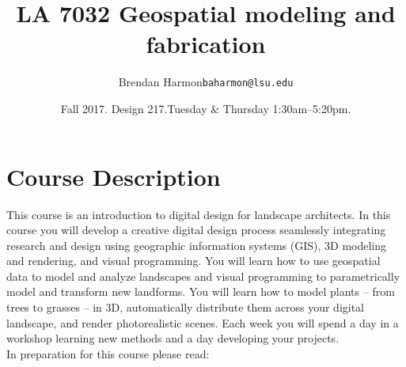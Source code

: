 \documentclass[11pt,article,oneside]{memoir}
\makeatletter
\def\myauthor{Author}
\def\mytitle{Title}
\def\myemail{baharmon@lsu.edu} %
\def\myauthor{Brendan Harmon}
\def\mytitle{{\normalsize \textsc{LA} 7032\newline} \huge \bfseries Geospatial modeling and fabrication}
\makeatother
\begin{document}
\setlength\bibitemsep{0.75em}

\setmainfont[Scale=1, Path = fonts/lato/,BoldItalicFont=Lato-RegIta,BoldFont=Lato-Reg,ItalicFont=Lato-LigIta]{Lato-Lig}
\setsansfont[Scale=1, Path = fonts/lato/,BoldItalicFont=Lato-RegIta,BoldFont=Lato-Reg,ItalicFont=Lato-LigIta]{Lato-Lig}
\setmonofont[Mapping=tex-text,Scale=0.8,Path = fonts/inconsolata/]{i}

\def\ind{\hangindent=1 true cm\hangafter=1 \noindent}
\def\labelitemi{$\cdot$}
\title{\LARGE \mytitle}     
\author{\Large\myauthor \newline \footnotesize\texttt{\noindent\myemail}}
\date{Fall 2017. Design 217.\newline Tuesday \& Thursday 1:30am--5:20pm.}
\published{\,}

\maketitle




\section{Course Description}

This course is an introduction to digital design for landscape architects. 
%
In this course you will develop a creative digital design process 
seamlessly integrating research and design
using geographic information systems (GIS),
3D modeling and rendering, and
visual programming. 
%
You will learn how to use geospatial data 
to model and analyze landscapes
and visual programming to 
parametrically model and transform new landforms. 
%
You will learn how to model plants -- from trees to grasses -- in 3D, 
automatically distribute them across your digital landscape,
and render photorealistic scenes. 
%
Each week you will spend a day in a workshop
learning new methods
and a day developing your projects.\\

\noindent In preparation for this course please read:
%
\nocite{*} \printbibliography[keyword=intro, heading=none]
\end{document}
